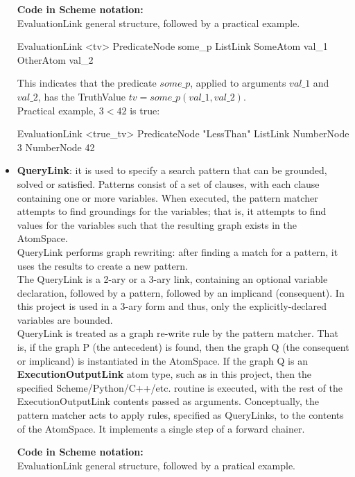 \begin{itemize}
\begin{footnotesize}\textbf{Code in Scheme notation:} \\
EvaluationLink general structure, followed by a practical example.
\end{footnotesize}
\begin{python}
	EvaluationLink <tv>
   		PredicateNode some_p
   		ListLink
       			SomeAtom val_1
       			OtherAtom val_2
\end{python}
This indicates that the predicate $some\_p$, applied to arguments $val\_1$ and $val\_2$, has the TruthValue $tv = some\_p(val\_1, val\_2)$. \\
Practical example, $3 < 42$ is true:
\begin{python}
	 EvaluationLink <true_tv>
		PredicateNode "LessThan"
		ListLink
			NumberNode 3
			NumberNode 42
\end{python}

	\item \textbf{QueryLink}: it is used to specify a search pattern that can be grounded, solved or satisfied. Patterns consist of a set of clauses, with each clause containing one or more variables. When executed, the pattern matcher attempts to find groundings for the variables; that is, it attempts to find values for the variables such that the resulting graph exists in the AtomSpace. \\
QueryLink performs graph rewriting: after finding a match for a pattern, it uses the results to create a new pattern. \\
The QueryLink is a 2-ary or a 3-ary link, containing an optional variable declaration, followed by a pattern, followed by an implicand (consequent). In this project is used in a 3-ary form and thus, only the explicitly-declared variables are bounded. \\
QueryLink is treated as a graph re-write rule by the pattern matcher. That is, if the graph P (the antecedent) is found, then the graph Q (the consequent or implicand) is instantiated in the AtomSpace. If the graph Q is an \textbf{ExecutionOutputLink} atom type, such as in this project, then the specified Scheme/Python/C++/etc. routine is executed, with the rest of the ExecutionOutputLink contents passed as arguments. Conceptually, the pattern matcher acts to apply rules, specified as QueryLinks, to the contents of the AtomSpace. It implements a single step of a forward chainer.

\begin{footnotesize}\textbf{Code in Scheme notation:} \\
EvaluationLink general structure, followed by a pratical example.
\end{footnotesize}


\end{itemize}
